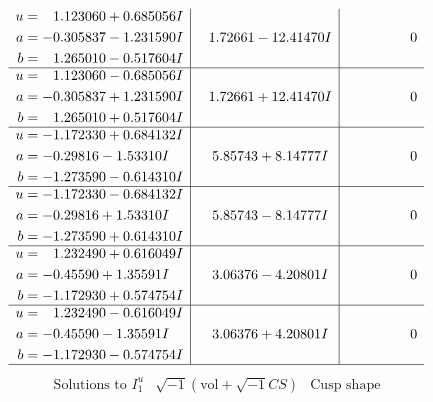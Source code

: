 \documentclass[1p]{elsarticle_modified}
\theoremstyle{definition}
\newcommand{\I}{\sqrt{-1}}
\begin{document}
$$\begin{array}{c|c|c}
\begin{aligned}
u &= \phantom{-}1.123060 + 0.685056 I \\
a &= -0.305837 - 1.231590 I \\
b &= \phantom{-}1.265010 - 0.517604 I\end{aligned}
 & \phantom{-}1.72661 - 12.41470 I & \phantom{-0.000000 } 0 \\ \hline\begin{aligned}
u &= \phantom{-}1.123060 - 0.685056 I \\
a &= -0.305837 + 1.231590 I \\
b &= \phantom{-}1.265010 + 0.517604 I\end{aligned}
 & \phantom{-}1.72661 + 12.41470 I & \phantom{-0.000000 } 0 \\ \hline\begin{aligned}
u &= -1.172330 + 0.684132 I \\
a &= -0.29816 - 1.53310 I \\
b &= -1.273590 - 0.614310 I\end{aligned}
 & \phantom{-}5.85743 + 8.14777 I & \phantom{-0.000000 } 0 \\ \hline\begin{aligned}
u &= -1.172330 - 0.684132 I \\
a &= -0.29816 + 1.53310 I \\
b &= -1.273590 + 0.614310 I\end{aligned}
 & \phantom{-}5.85743 - 8.14777 I & \phantom{-0.000000 } 0 \\ \hline\begin{aligned}
u &= \phantom{-}1.232490 + 0.616049 I \\
a &= -0.45590 + 1.35591 I \\
b &= -1.172930 + 0.574754 I\end{aligned}
 & \phantom{-}3.06376 - 4.20801 I & \phantom{-0.000000 } 0 \\ \hline\begin{aligned}
u &= \phantom{-}1.232490 - 0.616049 I \\
a &= -0.45590 - 1.35591 I \\
b &= -1.172930 - 0.574754 I\end{aligned}
 & \phantom{-}3.06376 + 4.20801 I & \phantom{-0.000000 } 0\\
 \hline 
 \end{array}$$\newpage$$\begin{array}{c|c|c}  
\text{Solutions to }I^u_{1}& \I (\text{vol} + \sqrt{-1}CS) & \text{Cusp shape}\\
 \hline 
\begin{aligned}

\end{aligned}
\end{array}$$
\end{document}
